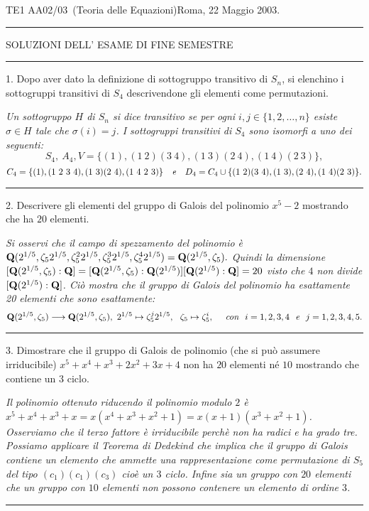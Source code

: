 \def\Q{{\bf Q}}
\hsize=19.5cm \vsize=27.58cm \hoffset=-1.6cm

\voffset=0.5cm
\parskip=1mm
\noindent  TE1 AA02/03\ (Teoria delle Equazioni)\hfill Roma, 22
Maggio 2003. \hrule
\medskip
\smallskip

\centerline{SOLUZIONI DELL' ESAME DI FINE SEMESTRE}\medskip

 \hfill \hrule
\medskip\medskip\medskip

\item{1.} Dopo aver dato la definizione di sottogruppo transitivo
di $S_n$, si elenchino i sottogruppi transitivi di $S_4$
descrivendone gli elementi come permutazioni.\medskip

{\it Un sottogruppo $H$ di $S_n$ si dice transitivo se per ogni
$i,j\in\{1,2,\ldots,n\}$ esiste $\sigma\in H$ tale che
$\sigma(i)=j$. I sottogruppi transitivi di $S_4$ sono isomorfi a
uno dei seguenti:
$$S_4,\ A_4, V=\{(1), (1\ 2)(3\ 4),(1\ 3)(2\ 4), (1\ 4)(2\ 3)\},$$
$$C_4=\{(1), (1\ 2\ 3\ 4), (1\ 3)(2\ 4), (1\ 4\ 2\ 3)\}\ \ \ {\it e}\ \ \
D_4=C_4\cup \{(1\ 2)(3\ 4), (1\ 3), (2\ 4),  (1\ 4)(2\ 3)\}.$$}
\smallskip
\hrule
\medskip

 \item{2.} Descrivere gli elementi del gruppo di Galois del polinomio $x^5-2$ mostrando
che ha $20$ elementi.\medskip

{\it Si osservi che il campo di spezzamento del polinomio \`{e}
$\Q(2^{1/5}, \zeta_52^{1/5}, \zeta_5^22^{1/5}, \zeta_5^32^{1/5}, \zeta_5^42^{1/5})=
\Q(2^{1/5}, \zeta_5).$ Quindi la dimensione
$[\Q(2^{1/5},
\zeta_5):\Q]=[\Q(2^{1/5}, \zeta_5):\Q(2^{1/5})][\Q(2^{1/5}):\Q]=20$ visto che
$4$ non divide $[\Q(2^{1/5}):\Q]$.
Ci\`{o} mostra che il gruppo di Galois del polinomio ha esattamente 20 elementi che sono esattamente:
$$\Q(2^{1/5}, \zeta_5)\longrightarrow \Q(2^{1/5}, \zeta_5),\
2^{1/5}\mapsto \zeta^j_52^{1/5},\ \ \zeta_5\mapsto \zeta_5^i, \ \
\ \ {\it con}\ \ i=1,2,3,4\ \ {\it e}\ \
j=1,2,3,4,5.$$}\smallskip\hrule
\medskip

  \item{3.} Dimostrare che il gruppo di Galois de polinomio
(che si pu\`{o} assumere irriducibile) $x^5+x^4+x^3+2x^2+3x+4$ non
ha $20$ elementi n\'{e} $10$ mostrando che contiene un $3$
ciclo.\medskip

{\it Il polinomio ottenuto riducendo il polinomio modulo $2$ \`{e}
$x^5+x^4+x^3+x=x(x^4+x^3+x^2+1)= x(x+1)(x^3+x^2+1)$. Osserviamo
che il terzo fattore \`{e} irriducibile perch\`{e} non ha radici e
ha grado tre. Possiamo applicare il Teorema di Dedekind che
implica che il gruppo di Galois contiene un elemento che ammette
una rappresentazione come permutazione di $S_5$ del tipo
$(c_1)(c_1)(c_3)$ cio\`{e} un $3$ ciclo. Infine sia un gruppo con
$20$ elementi che un gruppo con $10$ elementi non possono
contenere un elemento di ordine $3$.}
\medskip\hrule
\medskip

